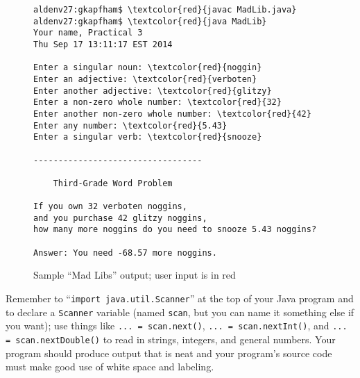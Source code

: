 \begin{figure}[tb]
\begin{Verbatim}[commandchars=\\\{\}]
aldenv27:gkapfham$ \textcolor{red}{javac MadLib.java}
aldenv27:gkapfham$ \textcolor{red}{java MadLib}
Your name, Practical 3
Thu Sep 17 13:11:17 EST 2014

Enter a singular noun: \textcolor{red}{noggin}
Enter an adjective: \textcolor{red}{verboten}
Enter another adjective: \textcolor{red}{glitzy}
Enter a non-zero whole number: \textcolor{red}{32}
Enter another non-zero whole number: \textcolor{red}{42}
Enter any number: \textcolor{red}{5.43}
Enter a singular verb: \textcolor{red}{snooze}

----------------------------------

    Third-Grade Word Problem

If you own 32 verboten noggins,
and you purchase 42 glitzy noggins,
how many more noggins do you need to snooze 5.43 noggins?

Answer: You need -68.57 more noggins.
\end{Verbatim}
\caption{Sample ``Mad Libs'' output; user input is in red}
\label{mad}
\end{figure}

Remember to ``{\tt import java.util.Scanner}'' at the top of your Java program and to declare a {\tt Scanner} variable
(named {\tt scan}, but you can name it something else if you want); use things like {\tt ... = scan.next()}, {\tt ...  =
  scan.nextInt()}, and {\tt ... = scan.nextDouble()} to read in strings, integers, and general numbers. Your program
should produce output that is neat and your program's source code must make good use of white space and labeling.




